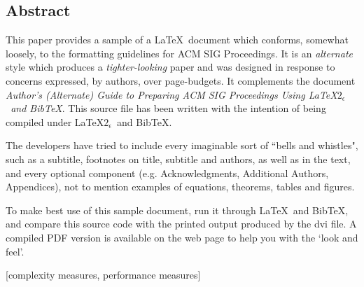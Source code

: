 
\subsection*{Abstract}
This paper provides a sample of a \LaTeX\ document which conforms, somewhat loosely, to the formatting guidelines for ACM SIG Proceedings. It is an {\em alternate} style which produces a {\em tighter-looking} paper and was designed in response to concerns expressed, by authors, over page-budgets. It complements the document \textit{Author's (Alternate) Guide to Preparing ACM SIG Proceedings Using \LaTeX$2_\epsilon$\ and Bib\TeX}. This source file has been written with the intention of being compiled under \LaTeX$2_\epsilon$\ and BibTeX.

The developers have tried to include every imaginable sort of ``bells and whistles", such as a subtitle, footnotes on title, subtitle and authors, as well as in the text, and every optional component (e.g. Acknowledgments, Additional Authors, Appendices), not to mention examples of equations, theorems, tables and figures. 

To make best use of this sample document, run it through \LaTeX\ and BibTeX, and compare this source code with the printed output produced by the dvi file. A compiled PDF version is available on the web page to help you with the `look and feel'. 



[complexity measures, performance measures]


